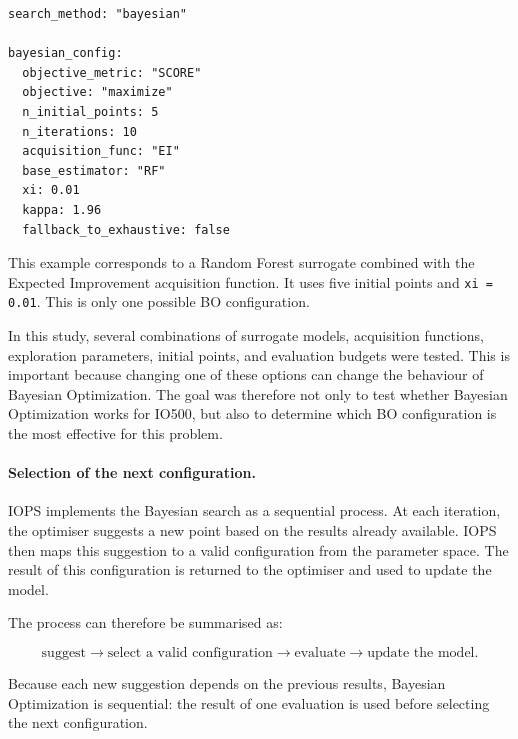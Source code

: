 \begin{verbatim}
search_method: "bayesian"

bayesian_config:
  objective_metric: "SCORE"
  objective: "maximize"
  n_initial_points: 5
  n_iterations: 10
  acquisition_func: "EI"
  base_estimator: "RF"
  xi: 0.01
  kappa: 1.96
  fallback_to_exhaustive: false
\end{verbatim}

This example corresponds to a Random Forest surrogate combined with the
Expected Improvement acquisition function. It uses five initial points
and \texttt{xi = 0.01}. This is only one possible BO configuration.

In this study, several combinations of surrogate models, acquisition
functions, exploration parameters, initial points, and evaluation budgets
were tested. This is important because changing one of these options can
change the behaviour of Bayesian Optimization. The goal was therefore not
only to test whether Bayesian Optimization works for IO500, but also to
determine which BO configuration is the most effective for this problem.

\paragraph{Selection of the next configuration.}

IOPS implements the Bayesian search as a sequential process. At each
iteration, the optimiser suggests a new point based on the results
already available. IOPS then maps this suggestion to a valid
configuration from the parameter space. The result of this configuration
is returned to the optimiser and used to update the model.

The process can therefore be summarised as:

\[
\text{suggest}
\rightarrow
\text{select a valid configuration}
\rightarrow
\text{evaluate}
\rightarrow
\text{update the model}.
\]

Because each new suggestion depends on the previous results, Bayesian
Optimization is sequential: the result of one evaluation is used before
selecting the next configuration.